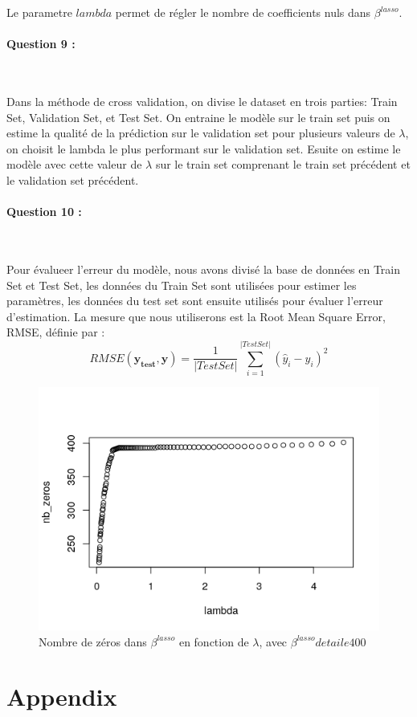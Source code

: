 \documentclass{article}
\begin{document}
Le parametre $lambda$ permet de régler le nombre de coefficients nuls dans $\beta^{lasso}$.

\paragraph{Question 9 :}
~\par

Dans la méthode de cross validation, on divise le dataset en trois parties: 
Train Set, Validation Set, et Test Set.
On entraine le modèle sur le train set puis on estime la qualité de la prédiction sur le validation set pour plusieurs valeurs de $\lambda$, on choisit le lambda le plus performant sur le validation set. Esuite on estime le modèle avec cette valeur de $\lambda$ sur le train set comprenant le train set précédent et le validation set précédent.

\paragraph{Question 10 :}
~\par

Pour évalueer l'erreur du modèle, nous avons divisé la base de données en Train Set et Test Set, les données du Train Set sont utilisées pour estimer les paramètres, les données du test set sont ensuite utilisés pour évaluer l'erreur d'estimation. La mesure que nous utiliserons est la Root Mean Square Error, RMSE, définie par :
\begin{equation}
RMSE(\textbf{y}_{\textbf{test}}, \hat{\textbf{y}})= \frac{1}{|Test Set|}\sum_{i=1}^{|Test Set|}{(\hat{y}_{i} - y_{i})^2}
\end{equation}

\begin{figure}[ht]
   \caption{\label{nb_zeros_cval} Nombre de zéros dans $\beta^{lasso}$ en fonction de $\lambda$, avec $\beta^{lasso} de taile 400$}
   \includegraphics[scale=0.5]{nb_zeros_cval.png}
\end{figure}



\newpage
\section{Appendix}


\end{document}
